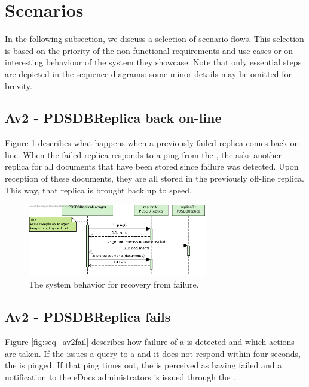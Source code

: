 \section{Scenarios}\label{sec:scenarios}
In the following subsection, we discuss a selection of scenario flows. This selection is based on the priority of the non-functional requirements and use cases or on interesting behaviour of the system they showcase. Note that only essential steps are depicted in the sequence diagrams: some minor details may be omitted for brevity.

\subsection{Av2 - PDSDBReplica back on-line}
Figure \ref{fig:seq_av2online} describes what happens when a previously failed replica comes back on-line. When the failed replica responds to a ping from the , the  asks another replica for all documents that have been stored since failure was detected. Upon reception of these documents, they are all stored in the previously off-line replica. This way, that replica is brought back up to speed.

\begin{figure}[!htp]
    \centering
    \includegraphics[width=0.7\textwidth]{figures/Av2 - PDSDBReplica back on-line.png}
    \caption{The system behavior for recovery from  failure.
        }\label{fig:seq_av2online}
\end{figure}

\subsection{Av2 - PDSDBReplica fails}
Figure \ref{fig:seq_av2fail} describes how failure of a  is detected and which actions are taken. If the  issues a query to a  and it does not respond within four seconds, the  is pinged. If that ping times out, the  is perceived as having failed and a notification to the eDocs administrators is issued through the .

